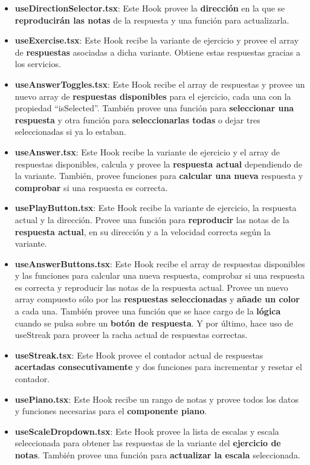 \documentclass[12pt,twoside,titlepage]{report}
\begin{document}
\begin{itemize}
    \item \textbf{useDirectionSelector.tsx}: Este Hook provee la \textbf{dirección} en la que se \textbf{reproducirán las notas} de la respuesta y una función para actualizarla.
    \item \textbf{useExercise.tsx}: Este Hook recibe la variante de ejercicio y provee el array de \textbf{respuestas} asociadas a dicha variante. Obtiene estas respuestas gracias a los servicios.
    \item \textbf{useAnswerToggles.tsx}: Este Hook recibe el array de respuestas y provee un nuevo array de \textbf{respuestas disponibles} para el ejercicio, cada una con la propiedad ``isSelected''. También provee una función para \textbf{seleccionar una respuesta} y otra función para \textbf{seleccionarlas todas} o dejar tres seleccionadas si ya lo estaban.
    \item \textbf{useAnswer.tsx}: Este Hook recibe la variante de ejercicio y el array de respuestas disponibles, calcula y provee la \textbf{respuesta actual} dependiendo de la variante. También, provee funciones para \textbf{calcular una nueva} respuesta y \textbf{comprobar} si una respuesta es correcta.
    \item \textbf{usePlayButton.tsx}: Este Hook recibe la variante de ejercicio, la respuesta actual y la dirección. Provee una función para \textbf{reproducir} las notas de la \textbf{respuesta actual}, en su dirección y a la velocidad correcta según la variante.
    \item \textbf{useAnswerButtons.tsx}:  Este Hook recibe el array de respuestas disponibles y las funciones para calcular una nueva respuesta, comprobar si una respuesta es correcta y reproducir las notas de la respuesta actual. Provee un nuevo array compuesto sólo por las \textbf{respuestas seleccionadas} y \textbf{añade un color} a cada una. También provee una función que se hace cargo de la \textbf{lógica} cuando se pulsa sobre un \textbf{botón de respuesta}. Y por último, hace uso de useStreak para proveer la racha actual de respuestas correctas.
    \item \textbf{useStreak.tsx}: Este Hook provee el contador actual de respuestas \textbf{acertadas consecutivamente} y dos funciones para incrementar y resetar el contador.
    \item \textbf{usePiano.tsx}: Este Hook recibe un rango de notas y provee todos los datos y funciones necesarias para el \textbf{componente piano}.
    \item \textbf{useScaleDropdown.tsx}: Este Hook provee la lista de escalas y escala seleccionada para obtener las respuestas de la variante del \textbf{ejercicio de notas}. También provee una función para \textbf{actualizar la escala} seleccionada.
\end{itemize}
\end{document}
